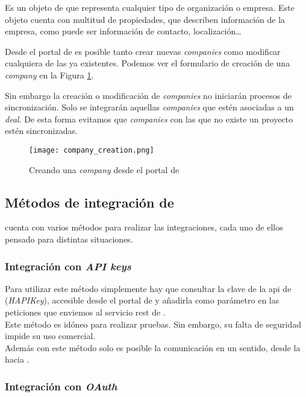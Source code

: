 		Es un objeto de \hs{} que representa cualquier tipo de organización o empresa. 
		Este objeto cuenta con multitud de propiedades, que describen información de la empresa, como puede ser información de contacto, localización\ldots 
		
		Desde el portal de \hs{} es posible tanto crear nuevas \textit{companies} como modificar cualquiera de las ya existentes. Podemos ver el formulario de creación de una \textit{company} en la Figura \ref{fig:company_creation}.
		
		Sin embargo la creación o modificación de \textit{companies} no iniciarán procesos de sincronización. Solo se integrarán aquellas \textit{companies} que estén asociadas a un \textit{deal}.
		De esta forma evitamos que \textit{companies} con las que no existe un proyecto estén sincronizadas.
		
		\begin{figure}
			\centering
			\texttt{[image: company\_creation.png]}
			\caption{Creando una \textit{company} desde el portal de \hs{}}
			\label{fig:company_creation}
		\end{figure}


\subsection{Métodos de integración de \hs{}}
\hs{} cuenta con varios métodos para realizar las integraciones, cada uno de ellos pensado para distintas situaciones.

\subsubsection{Integración con \textit{API keys}}

Para utilizar este método simplemente hay que consultar la clave de la \acrshort{api} de \hs{} (\textit{HAPIKey}), 
accesible desde el portal de \hs{} y añadirla como parámetro en las peticiones que enviemos al servicio \acrshort{rest} de \hs{}.\\

Este método es idóneo para realizar pruebas. Sin embargo, su falta de seguridad impide su uso comercial.\\

Además con este método solo es posible la comunicación en un sentido, desde la \iface{} hacia \hs{}.

\subsubsection{Integración con \textit{OAuth}}
\label{subsec:app_hs}

